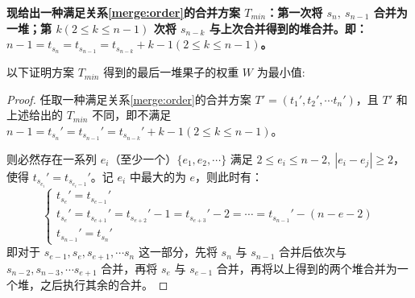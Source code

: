 \documentclass[11pt]{article}
\begin{document}
    \textbf{现给出一种满足关系\ref{merge:order}的合并方案 $T_{min}$：第一次将 $s_n,\ s_{n-1}$ 合并为一堆；第 $k(2\leq k \leq n-1)$ 次将 $s_{n-k}$ 与上次合并得到的堆合并。即：$n-1 = t_{s_n} = t_{s_{n-1}} = t_{s_{n-k}} + k-1(2\leq k \leq n-1)$。}
    
    以下证明方案 $T_{min}$ 得到的最后一堆果子的权重 $W$ 为最小值:
    \begin{proof}
        任取一种满足关系\ref{merge:order}的合并方案 $T'=(t_1', t_2', \cdots t_n')$，且 $T'$ 和上述给出的 $T_{min}$ 不同，即不满足$n-1 = t_{s_n}' = t_{s_{n-1}}' = t_{s_{n-k}}' + k-1(2\leq k \leq n-1)$。

        则必然存在一系列 $e_i$（至少一个）$\{e_1, e_2, \cdots\}$ 满足 $2\leq e_i \leq n-2,\ |e_i - e_j| \geq 2 $，使得 $t_{s_{e_i}}' = t_{s_{e_i-1}}'$。记 $e_i$ 中最大的为 $e$，则此时有：
        \begin{equation}
            \begin{cases}
                t_{s_e}'=t_{s_{e-1}}' \\
                t_{s_{e}}' = t_{s_{e+1}}' = t_{s_{e+2}}'-1 = t_{s_{e+3}}'-2 = \cdots = t_{s_{n-1}}'-(n-e-2)\\
                t_{s_{n-1}}' = t_{s_{n}}'
            \end{cases}
        \end{equation}
        即对于 $s_{e-1}, s_{e}, s_{e+1}, \cdots s_n$ 这一部分，先将 $s_n$ 与 $s_{n-1}$ 合并后依次与$s_{n-2}, s_{n-3}, \cdots s_{e+1}$ 合并，再将 $s_e$ 与 $s_{e-1}$ 合并，再将以上得到的两个堆合并为一个堆，之后执行其余的合并。


\end{proof}
\end{document}
